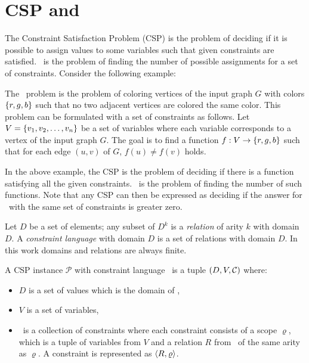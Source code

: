\chapter{CSP and \ccsp} 
The Constraint Satisfaction Problem (CSP) is the problem of deciding if it is possible to
assign values to some variables such that given constraints are satisfied. \ccsp\ 
is the problem of finding the number of possible assignments for a set of constraints.
Consider the following example:

\begin{example}[\tcoloring]\label{exm:3col}
The \tcoloring\ problem is the problem of coloring vertices of the input graph \(G\)
with colors \(\{{r,g,b}\}\) such that no two adjacent vertices are colored the same color.
This problem can be formulated with a set of constraints as follows.
Let \(V=\{{v_1,v_2,\dotsc,v_n}\}\)
be a set of variables where each variable corresponds to a vertex of
the input graph \(G\)\@. The goal is to find a function
\(f:V\to \{{r,g,b}\}\) such that for each edge \((u,v)\) of \(G\), \(f(u)\neq f(v)\) holds.
\end{example}

In the above example,
the CSP is the problem of deciding
if there is a function satisfying all the given constraints. \ccsp\ is the
problem of finding the number of such functions. Note that any CSP can then be expressed as 
deciding if the answer for \ccsp\ with the same set of constraints is greater zero.


Let \(D\) be a set of elements; any subset of \(D^k\) is a \emph{relation} of arity \(k\) with
domain \(D\)\@. A \emph{constraint language} with domain \(D\) is a set of
relations with domain \(D\)\@.
In this work domains and relations are always finite.

A CSP instance \(\mathcal{P}\) with constraint language \mrelset\ is a tuple 
\((D,V,\mathcal{C})\) where:
\begin{itemize}
\item \(D\) is a set of values which is the domain of \mrelset,
\item \(V\) is a set of variables,
\item \mconset\ is a collection of constraints where each constraint consists of a scope \(\varrho\),
which is a tuple of variables from \(V\) and a relation \(R\) from \mrelset\
of the same arity as \(\varrho\)\@. A constraint is represented as \(\langle R, \varrho \rangle\)\@.
\end{itemize}

